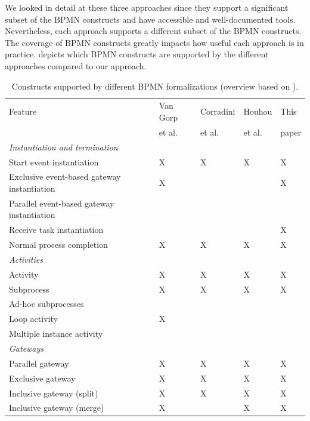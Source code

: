 \documentclass[submission, copyright, creativecommons]{eptcs}
\begin{document}
We looked in detail at these three approaches since they support a significant subset of the BPMN constructs and have accessible and well-documented tools.
Nevertheless, each approach supports a different subset of the BPMN constructs.
The coverage of BPMN constructs greatly impacts how useful each approach is in practice.
 depicts which BPMN constructs are supported by the different approaches compared to our approach.

\begin{table}[htbp]
    \caption{Constructs supported by different BPMN formalizations (overview based on \cite{vangorpVisualTokenbasedFormalization2013}).}
    \label{tab:supportedconstructs}
    \begin{threeparttable}
    \begin{tabular}{l l l l l}
    \hline
      Feature & Van Gorp &  Corradini & Houhou & This\\
      & et al. \cite{vangorpVisualTokenbasedFormalization2013} & et al. \cite{corradiniFormalApproachAnalysis2021}& et al. \cite{houhouFirstOrderLogicVerification2022} & paper\\
      \hline
      \textit{Instantiation and termination} & &\\
      Start event instantiation & X & X & X & X\\
      Exclusive event-based gateway instantiation & X & & & X\\
      Parallel event-based gateway instantiation &  & & & \\
      Receive task instantiation & & & & X\\
      Normal process completion & X & X & X & X\\
      \textit{Activities} & & & &\\
      Activity & X & X & X & X\\
      Subprocess & X & X & X & X\\
      Ad-hoc subprocesses & & & &\\
      Loop activity & X & & &\\
      Multiple instance activity & & & & \\
      \textit{Gateways} & & & &\\
      Parallel gateway & X & X & X & X\\
      Exclusive gateway & X & X & X & X\\
      Inclusive gateway (split) & X & X & X & X\\
      Inclusive gateway (merge) & X & & X & X\\

\end{tabular}
\end{threeparttable}
\end{table}
\end{document}
